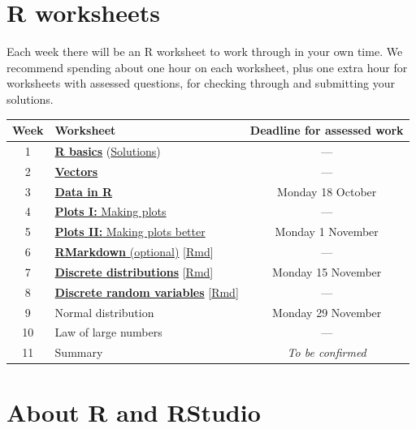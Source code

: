 \documentclass[
  a4paper,
]{book}
\theoremstyle{definition}
\theoremstyle{definition}
\theoremstyle{definition}
\theoremstyle{definition}
\theoremstyle{remark}
\begin{document}
\hypertarget{r-work}{%
\section*{R worksheets}\label{r-work}}

Each week there will be an R worksheet to work through in your own time. We recommend spending about one hour on each worksheet, plus one extra hour for worksheets with assessed questions, for checking through and submitting your solutions.

\begin{longtable}[]{@{}clc@{}}
\toprule
Week & Worksheet & Deadline for assessed work \\
\midrule
\endhead
1 & \href{https://mpaldridge.github.io/math1710/R1.html}{\textbf{R basics}} (\href{https://mpaldridge.github.io/math1710/R1-solutions.html}{Solutions}) & --- \\
2 & \href{https://mpaldridge.github.io/math1710/R2.html}{\textbf{Vectors}} & --- \\
3 & \href{https://mpaldridge.github.io/math1710/R3.html}{\textbf{Data in R}} & Monday 18 October \\
4 & \href{https://mpaldridge.github.io/math1710/R4.html}{\textbf{Plots I:} Making plots} & --- \\
5 & \href{https://mpaldridge.github.io/math1710/R5.html}{\textbf{Plots II:} Making plots better} & Monday 1 November \\
6 & \href{https://mpaldridge.github.io/math1710/R6.html}{\textbf{RMarkdown} (optional)} {[}\href{https://mpaldridge.github.io/math1710/R6.Rmd}{Rmd}{]} & --- \\
7 & \href{https://mpaldridge.github.io/math1710/R7.html}{\textbf{Discrete distributions}} {[}\href{https://mpaldridge.github.io/math1710/R7.Rmd}{Rmd}{]} & Monday 15 November \\
8 & \href{https://mpaldridge.github.io/math1710/R8.html}{\textbf{Discrete random variables}} {[}\href{https://mpaldridge.github.io/math1710/R8.Rmd}{Rmd}{]} & --- \\
9 & Normal distribution & Monday 29 November \\
10 & Law of large numbers & --- \\
11 & Summary & \emph{To be confirmed} \\
\bottomrule
\end{longtable}

\hypertarget{about-r}{%
\section*{About R and RStudio}\label{about-r}}
\end{document}
